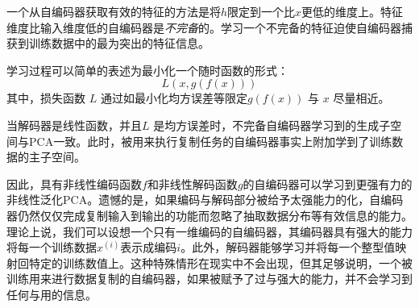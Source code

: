 一个从自编码器获取有效的特征的方法是将$h$限定到一个比$x$更低的维度上。特征维度比输入维度低的自编码器是\emph{不完备}的。学习一个不完备的特征迫使自编码器捕获到训练数据中的最为突出的特征信息。

学习过程可以简单的表述为最小化一个随时函数的形式：
\begin{equation}
	L(x,g(f(x)))
\end{equation}
其中，损失函数 $L$ 通过如最小化均方误差等限定$g(f(x))$ 与 $x$ 尽量相近。 

当解码器是线性函数，并且$L$ 是均方误差时，不完备自编码器学习到的生成子空间与PCA一致。此时，被用来执行复制任务的自编码器事实上附加学到了训练数据的主子空间。

因此，具有非线性编码函数$f$和非线性解码函数$g$的自编码器可以学习到更强有力的非线性泛化PCA。遗憾的是，如果编码与解码部分被给予太强能力的化，自编码器仍然仅仅完成复制输入到输出的功能而忽略了抽取数据分布等有效信息的能力。理论上说，我们可以设想一个只有一维编码的自编码器，其编码器具有强大的能力将每一个训练数据$x^{(i)}$表示成编码$i$。此外，解码器能够学习并将每一个整型值映射回特定的训练数值上。这种特殊情形在现实中不会出现，但其足够说明，一个被训练用来进行数据复制的自编码器，如果被赋予了过与强大的能力，并不会学习到任何与用的信息。